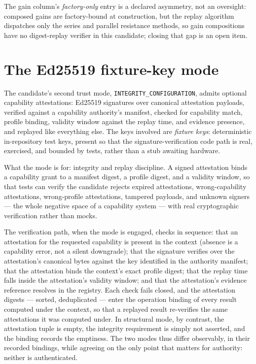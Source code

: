 The gain column's \emph{factory-only} entry is a declared asymmetry, not
an oversight: composed gains are factory-bound at construction, but the
replay algorithm dispatches only the series and parallel resistance
methods, so gain compositions have no digest-replay verifier in this
candidate; closing that gap is an open item.

\section{The Ed25519 fixture-key mode}\label{ch09:sec:ed25519}

The candidate's second trust mode, \texttt{INTEGRITY\_CONFIGURATION},
admits optional capability attestations: Ed25519 signatures over
canonical attestation payloads, verified against a capability authority's
manifest, checked for capability match, profile binding, validity window
against the replay time, and evidence presence, and replayed like
everything else. The keys involved are \emph{fixture keys}: deterministic
in-repository test keys, present so that the signature-verification code
path is real, exercised, and bounded by tests, rather than a stub awaiting
hardware.

What the mode is for: integrity and replay discipline. A signed
attestation binds a capability grant to a manifest digest, a profile
digest, and a validity window, so that tests can verify the candidate
rejects expired attestations, wrong-capability attestations,
wrong-profile attestations, tampered payloads, and unknown signers ---
the whole negative space of a capability system --- with real
cryptographic verification rather than mocks.

The verification path, when the mode is engaged, checks in sequence:
that an attestation for the requested capability is present in the
context (absence is a capability error, not a silent downgrade); that
the signature verifies over the attestation's canonical bytes against
the key identified in the authority manifest; that the attestation binds
the context's exact profile digest; that the replay time falls inside
the attestation's validity window; and that the attestation's evidence
reference resolves in the registry. Each check fails closed, and the
attestation digests --- sorted, deduplicated --- enter the operation
binding of every result computed under the context, so that a replayed
result re-verifies the same attestations it was computed under. In
structural mode, by contrast, the attestation tuple is empty, the
integrity requirement is simply not asserted, and the binding records
the emptiness. The two modes thus differ observably, in their recorded
bindings, while agreeing on the only point that matters for authority:
neither is authenticated.

